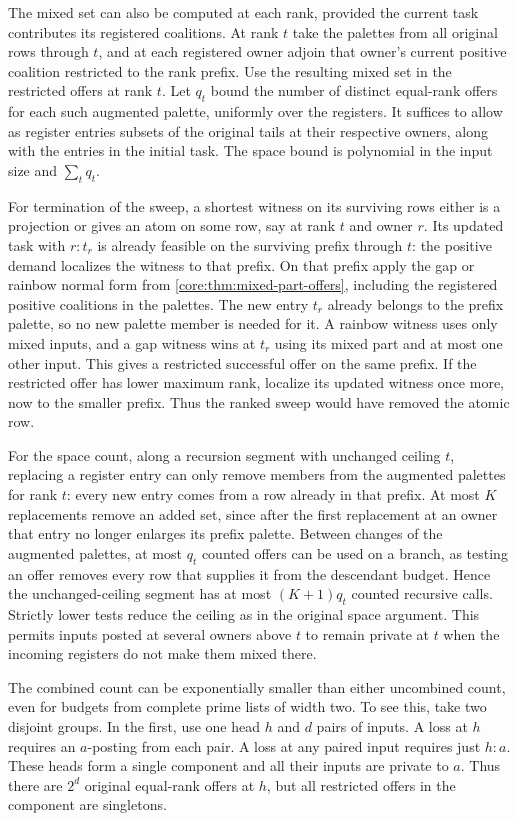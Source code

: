 The mixed set can also be computed at each rank, provided
the current task contributes its registered coalitions.
At rank $t$ take the palettes from all original rows
through $t$, and at each registered owner adjoin that
owner's current positive coalition restricted to the rank
prefix. Use the resulting mixed set in the restricted
offers at rank $t$. Let $q_t$ bound the number of distinct
equal-rank offers for each such augmented palette, uniformly
over the registers. It suffices to allow as register entries
subsets of the original tails at their respective owners,
along with the entries in the initial task. The space bound is polynomial in the input size and
$\sum_t q_t$.

For termination of the sweep, a shortest witness on its
surviving rows either is a projection or gives an atom on
some row, say at rank $t$ and owner $r$. Its updated task
with $r:t_r$ is already feasible on the surviving prefix
through $t$: the positive demand localizes the witness to
that prefix. On that prefix apply the gap or rainbow
normal form from \cref{core:thm:mixed-part-offers}, including
the registered positive coalitions in the palettes. The
new entry $t_r$ already belongs to the prefix palette, so
no new palette member is needed for it. A rainbow witness
uses only mixed inputs, and a gap witness wins at $t_r$
using its mixed part and at most one other input. This
gives a restricted successful offer on the same prefix.
If the restricted offer has lower maximum rank, localize
its updated witness once more, now to the smaller prefix.
Thus the ranked sweep would have removed the atomic row.

For the space count, along a recursion segment with
unchanged ceiling $t$, replacing a register entry can only
remove members from the augmented palettes for rank $t$:
every new entry comes from a row already in that prefix.
At most $K$ replacements remove an added set, since
after the first replacement at an owner that entry no
longer enlarges its prefix palette. Between changes of
the augmented palettes, at most $q_t$ counted offers
can be used on a branch, as testing an offer removes
every row that supplies it from the descendant budget.
Hence the unchanged-ceiling segment has at most
$(K+1)q_t$ counted recursive calls. Strictly lower tests
reduce the ceiling as in the original space argument.
This permits inputs posted at several owners above $t$
to remain private at $t$ when the incoming registers
do not make them mixed there.

The combined count can be exponentially smaller than either
uncombined count, even for budgets from complete prime lists
of width two. To see this, take two disjoint groups. In the
first, use one head $h$ and $d$ pairs of inputs. A loss at $h$
requires an $a$-posting from each pair. A loss at any paired
input requires just $h:a$. These heads form a single component
and all their inputs are private to $a$. Thus there are $2^d$
original equal-rank offers at $h$, but all restricted offers
in the component are singletons.

